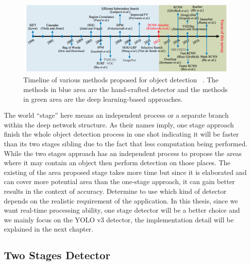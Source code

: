 \begin{figure}
    \includegraphics[width=\linewidth]{figures/timeline_od.png}
    \caption[Timeline of various methods proposed for object detection]
    {Timeline of various methods proposed for object detection
    ~\protect\cite{survey1-on-dl-od-2018}. The methods in blue area are the
    hand-crafted detector and the methods in green area are the deep
    learning-based approaches.}
    \label{fig:od-timeline}
\end{figure}

The world ``stage'' here means an independent process or a separate branch
within the deep network structure.
As their names imply, one stage approach finish the whole object detection
process in one shot indicating it will be faster than its two stages sibling
due to the fact that less computation being performed.
While the two stages approach has an independent process to propose the areas
where it may contain an object then perform detection on those places. The
existing of the area proposed stage takes more time but since it is elaborated
and can cover more potential area than the one-stage approach, it can gain
better results in the context of accuracy.
Determine to use which kind of detector depends on the realistic
requirement of the application. In this thesis, since we want real-time
processing ability, one stage detector will be a better choice and we mainly
focus on the YOLO v3 detector, the implementation detail will be explained in
the next chapter.

\subsection{Two Stages Detector}
\label{sec:related-worked-two-stages-detector}

